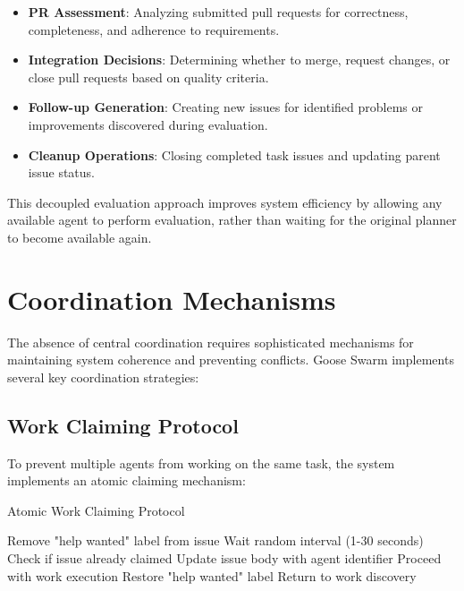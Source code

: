 \documentclass[11pt,a4paper]{article}
\begin{document}
\begin{itemize}
    \item \textbf{PR Assessment}: Analyzing submitted pull requests for correctness, completeness, and adherence to requirements.
    
    \item \textbf{Integration Decisions}: Determining whether to merge, request changes, or close pull requests based on quality criteria.
    
    \item \textbf{Follow-up Generation}: Creating new issues for identified problems or improvements discovered during evaluation.
    
    \item \textbf{Cleanup Operations}: Closing completed task issues and updating parent issue status.
\end{itemize}

This decoupled evaluation approach improves system efficiency by allowing any available agent to perform evaluation, rather than waiting for the original planner to become available again.

\section{Coordination Mechanisms}

The absence of central coordination requires sophisticated mechanisms for maintaining system coherence and preventing conflicts. Goose Swarm implements several key coordination strategies:

\subsection{Work Claiming Protocol}

To prevent multiple agents from working on the same task, the system implements an atomic claiming mechanism:

\begin{algorithm}
\caption{Atomic Work Claiming Protocol}
\begin{algorithmic}[1]
\STATE Remove "help wanted" label from issue
\STATE Wait random interval (1-30 seconds)
\STATE Check if issue already claimed
    \STATE Update issue body with agent identifier
    \STATE Proceed with work execution
\ELSE
    \STATE Restore "help wanted" label
    \STATE Return to work discovery
\ENDIF
\end{algorithmic}
\end{algorithm}
\end{document}
